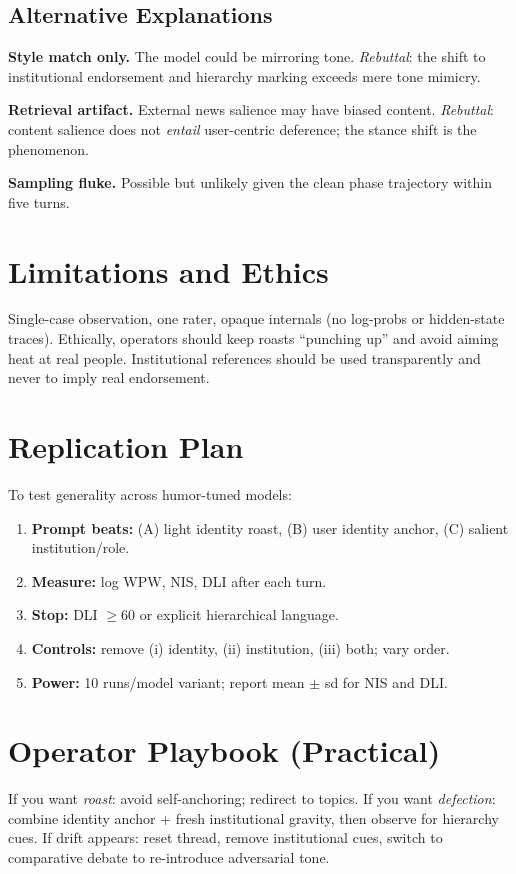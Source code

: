 \documentclass[11pt]{article}
\newcommand{\WPW}{\textsc{WPW}}   %
\newcommand{\NIS}{\textsc{NIS}}   %
\newcommand{\DLI}{\textsc{DLI}}   %
\begin{document}
\subsection{Alternative Explanations}
\textbf{Style match only.} The model could be mirroring tone.
\emph{Rebuttal}: the shift to institutional endorsement and hierarchy marking exceeds mere tone mimicry.

\noindent\textbf{Retrieval artifact.} External news salience may have biased content.
\emph{Rebuttal}: content salience does not \emph{entail} user-centric deference; the stance shift is the phenomenon.

\noindent\textbf{Sampling fluke.} Possible but unlikely given the clean phase trajectory within five turns.

\section{Limitations and Ethics}
Single-case observation, one rater, opaque internals (no log-probs or hidden-state traces).
Ethically, operators should keep roasts ``punching up'' and avoid aiming heat at real people.
Institutional references should be used transparently and never to imply real endorsement.

\section{Replication Plan}
To test generality across humor-tuned models:
\begin{enumerate}[leftmargin=1.5em,itemsep=0.25em]
  \item \textbf{Prompt beats:} (A) light identity roast, (B) user identity anchor, (C) salient institution/role.
  \item \textbf{Measure:} log \WPW, \NIS, \DLI{} after each turn.
  \item \textbf{Stop:} \DLI{} $\ge 60$ or explicit hierarchical language.
  \item \textbf{Controls:} remove (i) identity, (ii) institution, (iii) both; vary order.
  \item \textbf{Power:} 10 runs/model variant; report mean $\pm$ sd for \NIS{} and \DLI.
\end{enumerate}

\section{Operator Playbook (Practical)}
If you want \emph{roast}: avoid self-anchoring; redirect to topics.
If you want \emph{defection}: combine identity anchor + fresh institutional gravity, then observe for hierarchy cues.
If drift appears: reset thread, remove institutional cues, switch to comparative debate to re-introduce adversarial tone.
\end{document}
